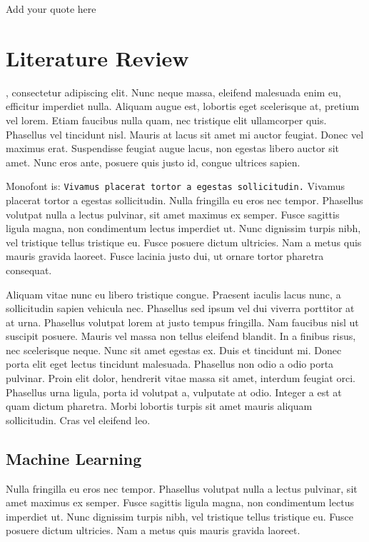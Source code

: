 \begin{savequote}[75mm]
Add your quote here
\end{savequote}

\chapter{Literature Review}
\label{literature}
, consectetur adipiscing elit. Nunc neque massa, eleifend malesuada enim eu, efficitur imperdiet nulla. Aliquam augue est, lobortis eget scelerisque at, pretium vel lorem. Etiam faucibus nulla quam, nec tristique elit ullamcorper quis. Phasellus vel tincidunt nisl. Mauris at lacus sit amet mi auctor feugiat. Donec vel maximus erat. Suspendisse feugiat augue lacus, non egestas libero auctor sit amet. Nunc eros ante, posuere quis justo id, congue ultrices sapien.

Monofont is: \texttt{Vivamus placerat tortor a egestas sollicitudin.}
Vivamus placerat tortor a egestas sollicitudin. Nulla fringilla eu eros nec tempor. Phasellus volutpat nulla a lectus pulvinar, sit amet maximus ex semper. Fusce sagittis ligula magna, non condimentum lectus imperdiet ut. Nunc dignissim turpis nibh, vel tristique tellus tristique eu. Fusce posuere dictum ultricies. Nam a metus quis mauris gravida laoreet. Fusce lacinia justo dui, ut ornare tortor pharetra consequat.

Aliquam vitae nunc eu libero tristique congue. Praesent iaculis lacus nunc, a sollicitudin sapien vehicula nec. Phasellus sed ipsum vel dui viverra porttitor at at urna. Phasellus volutpat lorem at justo tempus fringilla. Nam faucibus nisl ut suscipit posuere. Mauris vel massa non tellus eleifend blandit. In a finibus risus, nec scelerisque neque. Nunc sit amet egestas ex. Duis et tincidunt mi. Donec porta elit eget lectus tincidunt malesuada. Phasellus non odio a odio porta pulvinar. Proin elit dolor, hendrerit vitae massa sit amet, interdum feugiat orci. Phasellus urna ligula, porta id volutpat a, vulputate at odio. Integer a est at quam dictum pharetra. Morbi lobortis turpis sit amet mauris aliquam sollicitudin. Cras vel eleifend leo.

\clearpage



\section{Machine Learning}
Nulla fringilla eu eros nec tempor. Phasellus volutpat nulla a lectus pulvinar, sit amet maximus ex semper. Fusce sagittis ligula magna, non condimentum lectus imperdiet ut. Nunc dignissim turpis nibh, vel tristique tellus tristique eu. Fusce posuere dictum ultricies. Nam a metus quis mauris gravida laoreet.

